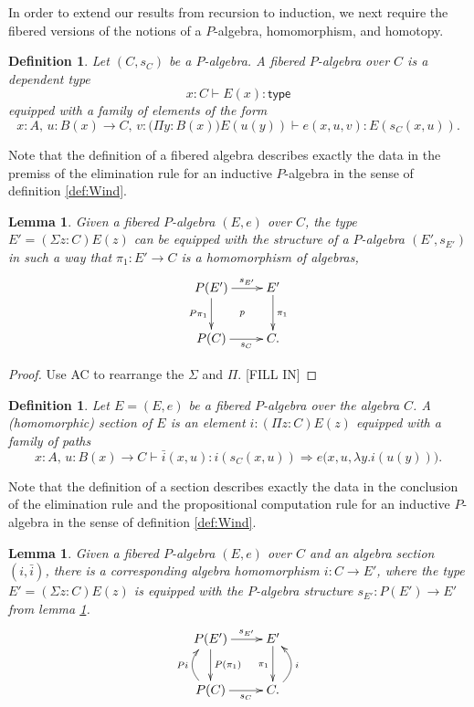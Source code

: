 \documentclass[10pt,a4paper,oneside,reqno]{amsart}
\numberwithin{equation}{section}
\theoremstyle{mythm}
\newtheorem{lemma}[theorem]{Lemma}
\theoremstyle{mydef}
\newtheorem{definition}[theorem]{Definition}
\theoremstyle{myrmk}
\newcommand{\peq}{\Rightarrow}
\newcommand{\co}{\colon}
\newcommand{\type}{\mathsf{type}}
\begin{document}

In order to extend our results from recursion to induction, we next require the fibered versions of the notions of a $P$-algebra, homomorphism, and homotopy.

\begin{definition} \label{def:fibalg}
Let $(C, s_C)$ be a $P$-algebra. A \emph{fibered $P$-algebra} over $C$ is a dependent type
\[
x : C \vdash E(x) \co \type
\]
equipped with a family of elements of the form
\[
x:A,\, u : B(x) \to C,\, v : \big(\Pi{y:B(x)}\big) E(u(y)) \vdash e(x,u,v) :E(s_C(x,u)).
\]
\end{definition}

Note that the definition of a fibered algebra describes exactly the data in the premiss of the elimination rule for an inductive $P$-algebra in the sense of definition \ref{def:Wind}. 

\begin{lemma}\label{lem:fibalg}
Given a fibered $P$-algebra $(E, e)$ over $C$, the type $E' = (\Sigma z : C) E(z)$ can be equipped with the structure of a $P$-algebra $(E', s_{E'})$ in such a way that $\pi_1 : E'\to C$ is a homomorphism of algebras,
\[
\xymatrix{
P(E') \ar[d]_{P\pi_1} \ar[r]^-{s_{E'}} \ar@{}[rd]|{p} & E' \ar[d]^{\pi_1} \\ 
P(C) \ar[r]_-{s_C} & C.}
 \]
\end{lemma}

\begin{proof}
Use AC to rearrange the $\Sigma$ and $\Pi$.
[FILL IN]
\end{proof}

\begin{definition} \label{def:fibalgsection} Let $E = (E, e)$ be a fibered $P$-algebra over the algebra $C$.  A \emph{(homomorphic) section} of $E$ is an element $i \co (\Pi z \co C) E(z)$ equipped with a family of paths $$ x:A,\, u : B(x) \to C \vdash \bar{i}(x, u) : i(s_C(x,u)) \peq e\big(x,u,\lambda{y}.i(u(y))\big).$$
\end{definition} 

Note that the definition of a section describes exactly the data in the conclusion of the elimination rule and the propositional computation rule for an inductive $P$-algebra in the sense of definition \ref{def:Wind}. 

\begin{lemma}\label{lem:fibalghom}
Given a fibered $P$-algebra $(E, e)$ over $C$ and an algebra section $(i, \bar{i})$, there is a corresponding algebra homomorphism $i : C\to E'$, where the type $E' = (\Sigma z : C) E(z)$ is equipped with the $P$-algebra structure $s_{E'} :P(E')\to E'$ from lemma \ref{lem:fibalg}.
\[
\xymatrix{
P(E') \ar[d]^{P(\pi_1)} \ar[r]^-{s_{E'}} %
	 & E' \ar[d]_{\pi_1} \\ 
P(C)  \ar@/^1.2pc/[u]^{Pi} \ar[r]_-{s_C} & C  \ar@/_1.2pc/[u]_{i}.}
 \]
\end{lemma}
\end{document}
